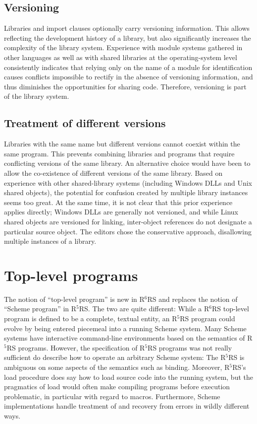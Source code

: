 \documentclass[twoside,twocolumn]{algol60}
\newcommand{\rn}[1]{R$^{#1}$RS}
\begin{document}
\section{Versioning}

Libraries and {\cf import} clauses optionally carry versioning
information.  This allows reflecting the development history of a
library, but also significantly increases the complexity of the
library system.  Experience with module systems gathered in other
languages as well as with shared libraries at the operating-system
level consistently indicates that relying only on the name of a module
for identification causes conflicts impossible to rectify in the
absence of versioning information, and thus diminishes the
opportunities for sharing code.  Therefore, versioning is part of the
library system.

\section{Treatment of different versions}

Libraries with the same name but different versions cannot coexist
within the same program.  This prevents combining libraries and
programs that require conflicting versions of the same library.  An
alternative choice would have been to allow the co-existence of
different versions of the same library.  Based on experience with
other shared-library systems (including Windows DLLs and Unix shared
objects), the potential for confusion created by multiple library
instances seems too great. At the same time, it is not clear that this
prior experience applies directly; Windows DLLs are generally not
versioned, and while Linux shared objects are versioned for linking,
inter-object references do not designate a particular source object.
The editors chose the conservative approach, disallowing multiple
instances of a library.

\chapter{Top-level programs}

The notion of ``top-level program'' is new in \rn{6} and replaces the
notion of ``Scheme program'' in \rn{5}.  The two are quite different:
While a \rn{6} top-level program is defined to be a complete, textual
entity, an \rn{5} program could evolve by being entered piecemeal into
a running Scheme system.  Many Scheme systems have interactive
command-line environments based on the semantics of \rn{5} programs.
However, the specification of \rn{5} programs was not really
sufficient do describe how to operate an arbitrary Scheme system: The
\rn{5} is ambiguous on some aspects of the semantics such as binding.
Moreover, \rn{5}'s {\cf load} procedure does say how to load source
code into the running system, but the pragmatics of {\cf load} would
often make compiling programs before execution problematic, in
particular with regard to macros.  Furthermore, Scheme implementations
handle treatment of and recovery from errors in wildly different ways.
\end{document}
